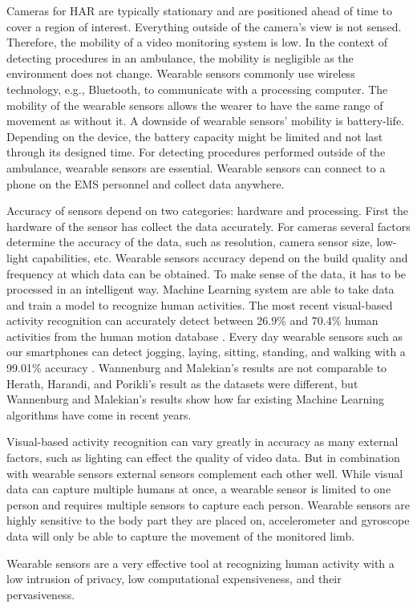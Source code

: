 \par Cameras for HAR are typically stationary and are positioned ahead of time to cover a region of interest. Everything outside of the camera’s view is not sensed. Therefore, the mobility of a video monitoring system is low. In the context of detecting procedures in an ambulance, the mobility is negligible as the environment does not change. Wearable sensors commonly use wireless technology, e.g., Bluetooth, to communicate with a processing computer. The mobility of the wearable sensors allows the wearer to have the same range of movement as without it. A downside of wearable sensors' mobility is battery-life. Depending on the device, the battery capacity might be limited and not last through its designed time. For detecting procedures performed outside of the ambulance, wearable sensors are essential. Wearable sensors can connect to a phone on the EMS personnel and collect data anywhere.
\par Accuracy of sensors depend on two categories: hardware and processing. First the hardware of the sensor has collect the data accurately. For cameras several factors determine the accuracy of the data, such as resolution, camera sensor size, low-light capabilities, etc. Wearable sensors accuracy depend on the build quality and frequency at which data can be obtained. To make sense of the data, it has to be processed in an intelligent way. Machine Learning system are able to take data and train a model to recognize human activities. The most recent visual-based activity recognition can accurately detect between 26.9\% and 70.4\% \cite{Herath2017} human activities from the human motion database \cite{Kuehne11}. Every day wearable sensors such as our smartphones can detect jogging, laying, sitting, standing, and walking with a 99.01\% accuracy \cite{Wannenburg2016}. Wannenburg and Malekian's results are not comparable to Herath, Harandi, and Porikli's result as the datasets were different, but Wannenburg and Malekian’s results show how far existing Machine Learning algorithms have come in recent years.
\par Visual-based activity recognition can vary greatly in accuracy as many external factors, such as lighting can effect the quality of video data. But in combination with wearable sensors external sensors complement each other well. While visual data can capture multiple humans at once, a wearable sensor is limited to one person and requires multiple sensors to capture each person. Wearable sensors are highly sensitive to the body part they are placed on, accelerometer and gyroscope data will only be able to capture the movement of the monitored limb.
\par Wearable sensors are a very effective tool at recognizing human activity with a low intrusion of privacy, low computational expensiveness, and their pervasiveness.


